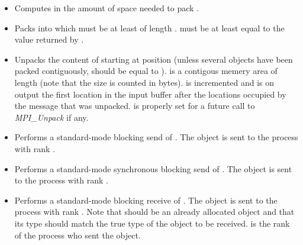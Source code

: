 \begin{itemize}
\item {}
  \sshortdescribe Computes in  the amount of space needed to pack .
\item {}
  \sshortdescribe Packs  into  which must be at least of
  length .  must be at least equal to the value returned
  by . 
\item {}
  \sshortdescribe Unpacks the content of  starting at position
   (unless several objects have been packed contiguously,  should be equal to ).  is a contigous memery area
  of length  (note that the size is counted in bytes).
   is incremented and is on output the first location in the input
  buffer after the locations occupied by the message that was
  unpacked.  is properly set for a future call to {\it MPI_Unpack}
  if any.
  
\item {}
  \sshortdescribe Performs a standard-mode blocking send of . The
  object is sent to the process with rank .

\item {}
  \sshortdescribe Performs a standard-mode synchronous blocking send of
  . The object is sent to the process with rank .
  
\item {} 
  \sshortdescribe Performs a standard-mode blocking receive of . The
  object is sent to the process with rank . Note that 
  should be an already allocated object and that its type should match the
  true type of the object to be received.  is the rank of the
  process who sent the object.


\end{itemize}
